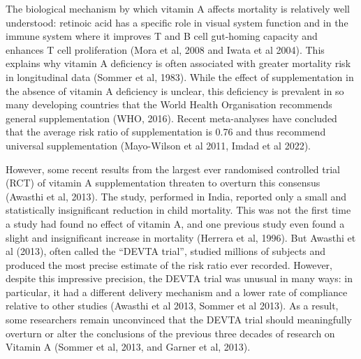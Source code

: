 \documentclass[12pt]{article}
\begin{document}
The biological mechanism by which vitamin A affects mortality is relatively well understood: retinoic acid has a specific role in visual system function and in the immune system where it improves T and B cell gut-homing capacity and enhances T cell proliferation (Mora et al, 2008 and Iwata et al 2004). This explains why vitamin A deficiency is often associated with greater mortality risk in longitudinal data (Sommer et al, 1983). While the effect of supplementation in the absence of vitamin A deficiency is unclear, this deficiency is prevalent in so many developing countries that the World Health Organisation recommends general supplementation (WHO, 2016). 
Recent meta-analyses have concluded that the average risk ratio of supplementation is 0.76 and thus recommend universal supplementation (Mayo-Wilson et al 2011, Imdad et al 2022). 

However, some recent results from the largest ever randomised controlled trial (RCT) of vitamin A supplementation threaten to overturn this consensus (Awasthi et al, 2013). The study, performed in India, reported only a small and statistically insignificant reduction in child mortality. This was not the first time a study had found no effect of vitamin A, and one previous study even found a slight and insignificant increase in mortality (Herrera et al, 1996). But Awasthi et al (2013), often called the ``DEVTA trial'', studied millions of subjects and produced the most precise estimate of the risk ratio ever recorded. However, despite this impressive precision, the DEVTA trial was unusual in many ways: in particular, it had a different delivery mechanism and a lower rate of compliance relative to other studies (Awasthi et al 2013, Sommer et al 2013). As a result, some researchers remain unconvinced that the DEVTA trial should meaningfully overturn or alter the conclusions of the previous three decades of research on Vitamin A (Sommer et al, 2013, and Garner et al, 2013).
\end{document}
